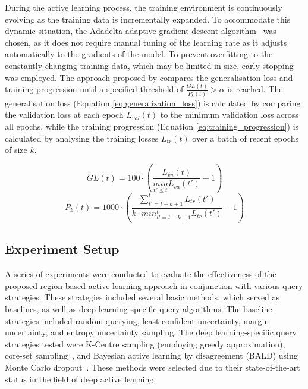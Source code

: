 During the active learning process, the training environment is continuously evolving as the training data is incrementally expanded. To accommodate this dynamic situation, the Adadelta adaptive gradient descent algorithm~\citep{zeiler2012adadelta} was chosen, as it does not require manual tuning of the learning rate as it adjusts automatically to the gradients of the model. To prevent overfitting to the constantly changing training data, which may be limited in size, early stopping was employed. The approach proposed by \cite{prechelt2012early} compares the generalisation loss and training progression until a specified threshold of $\frac{GL(t)}{P_k(t)} > \alpha$ is reached. The generalisation loss (Equation \ref{eq:generalization_loss}) is calculated by comparing the validation loss at each epoch $L_{val}(t)$ to the minimum validation loss across all epochs, while the training progression (Equation \ref{eq:training_progression}) is calculated by analysing the training losses $L_{tr}(t)$ over a batch of recent epochs of size $k$.

\begin{equation}
	GL(t) = 100 \cdot \left ( \frac{L_{va}(t)}{\underset{t'\leq t}{min}L_{va}(t')} - 1 \right )
	\label{eq:generalization_loss}
\end{equation}
\begin{equation}
	P_k(t) = 1000 \cdot \left ( \frac{\sum_{t'=t-k+1}^{t}L_{tr}(t')}{k \cdot min^{t}_{t'=t-k+1}L_{tr}(t')} - 1\right )
	\label{eq:training_progression}
\end{equation}

\subsection{Experiment Setup}
\label{subsec:active_experiments}
A series of experiments were conducted to evaluate the effectiveness of the proposed region-based active learning approach in conjunction with various query strategies. These strategies included several basic methods, which served as baselines, as well as deep learning-specific query algorithms. The baseline strategies included random querying, least confident uncertainty, margin uncertainty, and entropy uncertainty sampling. The deep learning-specific query strategies tested were K-Centre sampling (employing greedy approximation), core-set sampling~\citep{sener2017active}, and Bayesian active learning by disagreement (BALD) using Monte Carlo dropout~\citep{gal2017deep}. These methods were selected due to their state-of-the-art status in the field of deep active learning. 

